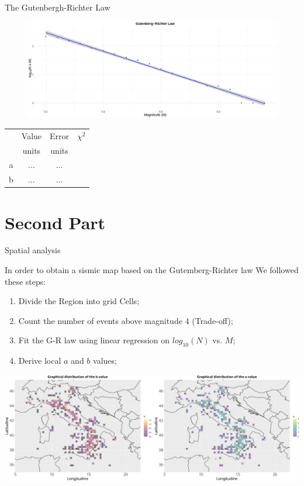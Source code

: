 \documentclass[aspectratio=43]{beamer}
\begin{document}
\begin{frame}{The Gutenbergh-Richter Law}
	
	\begin{figure}[t]
		\centering
		\includegraphics[width=1\textwidth]{EQ_images_ben/eq_gr_law.png}		
	\end{figure}
	

		\centering
		\begin{tabular}{c|ccc}
			\toprule
			    & Value & Error & $\chi^2$ \\
			    & units & units & \\
			\midrule
			a & ... & ... & \\
			b  & ... & ... & \\
			\bottomrule
		\end{tabular}
		
\end{frame}


\section{Second Part}

\begin{frame}{Spatial analysis}

In order to obtain a sismic map based on the Gutemberg-Richter law We followed these steps:\pause

\begin{enumerate}
	\item Divide the Region into grid Cells; \pause
	\item Count the number of events above magnitude $4$ (Trade-off); \pause
	\item Fit the G-R law using linear regression on $log_{10}(N)$ vs. $M$; \pause
	\item Derive local $a$ and $b$ values; \pause
	
\end{enumerate}

\centering
\includegraphics[width=1\textwidth]{EQ_images/G_R_parameters.png} \\

\end{frame}
\end{document}
